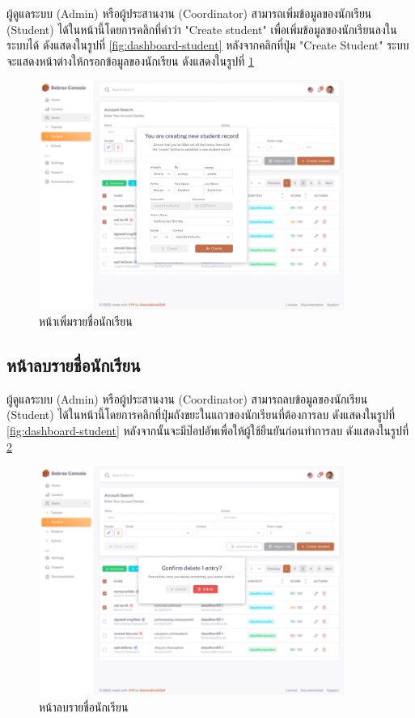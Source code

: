 ผู้ดูแลระบบ (Admin) หรือผู้ประสานงาน (Coordinator) สามารถเพิ่มข้อมูลของนักเรียน (Student) ได้ในหน้านี้โดยการคลิกที่คำว่า "Create student" เพื่อเพิ่มข้อมูลของนักเรียนลงในระบบได้ ดังแสดงในรูปที่ \ref{fig:dashboard-student} หลังจากคลิกที่ปุ่ม "Create Student" ระบบจะแสดงหน้าต่างให้กรอกข้อมูลของนักเรียน ดังแสดงในรูปที่ \ref{fig:create-student-dialog}

\begin{figure}[H]
    \centering
    \includegraphics[width=100mm,scale=1.0]{images/create-student.png}
    \caption{หน้าเพิ่มรายชื่อนักเรียน}
    \label{fig:create-student-dialog}
\end{figure}

\subsection{หน้าลบรายชื่อนักเรียน}

ผู้ดูแลระบบ (Admin) หรือผู้ประสานงาน (Coordinator) สามารถลบข้อมูลของนักเรียน (Student) ได้ในหน้านี้โดยการคลิกที่ปุ่มถังขยะในแถวของนักเรียนที่ต้องการลบ ดังแสดงในรูปที่ \ref{fig:dashboard-student} หลังจากนั้นจะมีป๊อปอัพเพื่อให้ผู้ใช้ยืนยันก่อนทำการลบ ดังแสดงในรูปที่ \ref{fig:remove-student}

\begin{figure}[H]
    \centering
    \includegraphics[width=100mm,scale=1.0]{images/remove-student.png}
    \caption{หน้าลบรายชื่อนักเรียน}
    \label{fig:remove-student}
\end{figure}